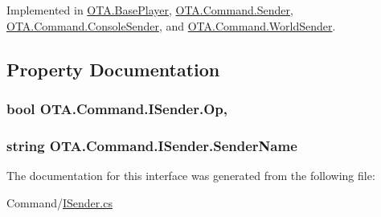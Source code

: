 Implemented in \hyperlink{class_o_t_a_1_1_base_player_a59a949bff7e0cb3588079ae55edf1e74}{O\+T\+A.\+Base\+Player}, \hyperlink{class_o_t_a_1_1_command_1_1_sender_ab4cea2690d2299d322ec51cce16ec7a4}{O\+T\+A.\+Command.\+Sender}, \hyperlink{class_o_t_a_1_1_command_1_1_console_sender_ab1569d02090c217a52d8e25f6846504c}{O\+T\+A.\+Command.\+Console\+Sender}, and \hyperlink{class_o_t_a_1_1_command_1_1_world_sender_ae9a43321b90fd540c6b19cfa04babffa}{O\+T\+A.\+Command.\+World\+Sender}.



\subsection{Property Documentation}
\hypertarget{interface_o_t_a_1_1_command_1_1_i_sender_a0f976299ffb288c46449ffb1bf61308b}{}
\subsubsection[{Op}]{\setlength{\rightskip}{0pt plus 5cm}bool O\+T\+A.\+Command.\+I\+Sender.\+Op\hspace{0.3cm}{\ttfamily [get]}, {\ttfamily [set]}}\label{interface_o_t_a_1_1_command_1_1_i_sender_a0f976299ffb288c46449ffb1bf61308b}
\hypertarget{interface_o_t_a_1_1_command_1_1_i_sender_a27b05ff3ef4c1a9aac594e3e60d768f8}{}
\subsubsection[{Sender\+Name}]{\setlength{\rightskip}{0pt plus 5cm}string O\+T\+A.\+Command.\+I\+Sender.\+Sender\+Name\hspace{0.3cm}{\ttfamily [get]}}\label{interface_o_t_a_1_1_command_1_1_i_sender_a27b05ff3ef4c1a9aac594e3e60d768f8}


The documentation for this interface was generated from the following file\+:\begin{DoxyCompactItemize}
\item 
Command/\hyperlink{_i_sender_8cs}{I\+Sender.\+cs}\end{DoxyCompactItemize}
